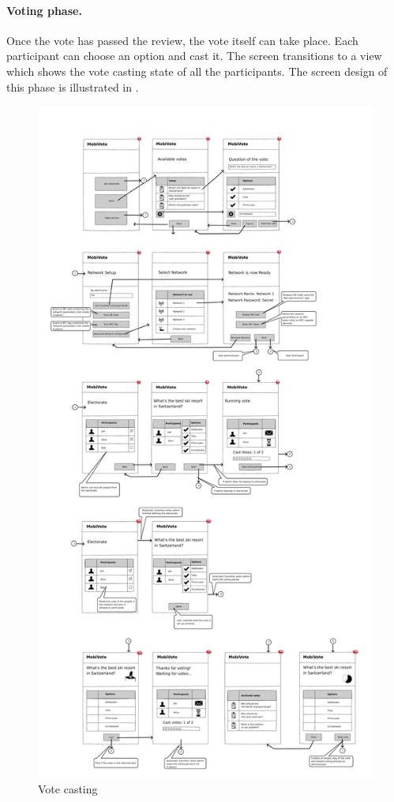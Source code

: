 \documentclass[numbers=noenddot, abstract=on, a4paper, headsepline,
footsepline, oneside, draft=off]{scrreprt}
\begin{document}
\paragraph{Voting phase.}
Once the vote has passed the review, the vote itself can take place. Each
participant can choose an option and cast it. The screen transitions to a view
which shows the vote casting state of all the participants. The screen
design of this phase is illustrated in .

\begin{figure}[htbp]
	\centering
	\includegraphics[height=.4\textheight]{img/vote}
	\caption{Vote casting}
	\label{fig:vote}
\end{figure}
\end{document}
